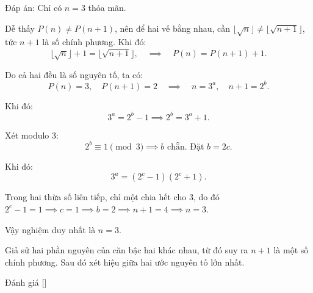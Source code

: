 \ifshowproblemandsoln
\ifshowproblem{}
\fi

\ifshowsoln
\begin{soln}\footnotemark
    Đáp án: Chỉ có \( n = 3 \) thỏa mãn.

    Dễ thấy \( P(n) \ne P(n+1) \), nên để hai vế bằng nhau, cần \( \lfloor \sqrt{n} \rfloor \ne \lfloor \sqrt{n+1} \rfloor \), tức \( n + 1 \) là số chính phương.
    Khi đó:
    \[
        \lfloor \sqrt{n} \rfloor + 1 = \lfloor \sqrt{n+1} \rfloor, \quad \implies \quad P(n) = P(n+1) + 1.
    \]
    
    Do cả hai đều là số nguyên tố, ta có:
    \[
        P(n) = 3,\quad P(n+1) = 2 \quad \implies \quad n = 3^a,\quad n + 1 = 2^b.
    \]
    
    Khi đó:
    \[
        3^a = 2^b - 1 \implies 2^b = 3^a + 1.
    \]

    Xét modulo 3:
    \[
        2^b \equiv 1 \pmod{3} \implies b \text{ chẵn. Đặt } b = 2c.
    \]

    Khi đó:
    \[
        3^a = (2^c - 1)(2^c + 1).
    \]

    Trong hai thừa số liên tiếp, chỉ một chia hết cho 3, do đó \( 2^c - 1 = 1 \implies c = 1 \implies b = 2 \implies n + 1 = 4 \implies n = 3 \).

    Vậy nghiệm duy nhất là \( \boxed{n = 3} \).
\end{soln}
\fi

\ifshowhint
\begin{hint*}
    Giả sử hai phần nguyên của căn bậc hai khác nhau, từ đó suy ra \(n+1\) là một số chính phương. Sau đó xét hiệu giữa hai ước nguyên tố lớn nhất.
\end{hint*}
\fi

\ifshowremark
\begin{remark*}
    Đánh giá [\textbf{}]
\end{remark*}
\newpage
\fi